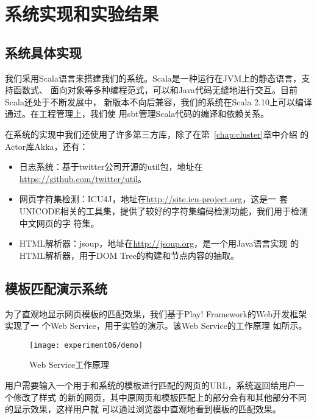 
\chapter{系统实现和实验结果}
\label{chap:experiment}

\section{系统具体实现}
\label{sec:implementation}
我们采用Scala语言来搭建我们的系统。Scala是一种运行在JVM上的静态语言，支持函数式、
面向对象等多种编程范式，可以和Java代码无缝地进行交互。目前Scala还处于不断发展中，
新版本不向后兼容，我们的系统在Scala 2.10上可以编译通过。在工程管理上，我们使
用sbt管理Scala代码的编译和依赖关系。

在系统的实现中我们还使用了许多第三方库，除了在第~\ref{chap:cluster}章中介绍
的Actor库Akka，还有：
\begin{itemize}
\item 日志系统：基于twitter公司开源的util包，地址在
  \url{https://github.com/twitter/util}。
\item 网页字符集检测：ICU4J，地址在\url{http://site.icu-project.org}，这是一
  套UNICODE相关的工具集，提供了较好的字符集编码检测功能，我们用于检测中文网页的字
  符集。
\item HTML解析器：jsoup，地址在\url{http://jsoup.org}，是一个用Java语言实现
  的HTML解析器，用于DOM Tree的构建和节点内容的抽取。
\end{itemize}
\section{模板匹配演示系统}
\label{sec:demo}
为了直观地显示网页模板的匹配效果，我们基于Play! Framework的Web开发框架实现了一
个Web Service，用于实验的演示。该Web Service的工作原理
如所示。
\begin{figure}
  \centering
  \texttt{[image: experiment06/demo]}
  \caption{Web Service工作原理}
  \label{experiment:fig:demo}
\end{figure}

用户需要输入一个用于和系统的模板进行匹配的网页的URL，系统返回给用户一个修改了样式
的新的网页，其中原网页和模板匹配上的部分会有和其他部分不同的显示效果，这样用户就
可以通过浏览器中直观地看到模板的匹配效果。


